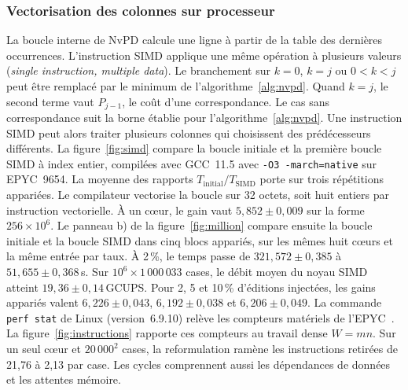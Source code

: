 \subsubsection{Vectorisation des colonnes sur processeur}
La boucle interne de NvPD calcule une ligne à partir de la table des dernières occurrences. L'instruction SIMD applique une même opération à plusieurs valeurs (\emph{single instruction, multiple data}). Le branchement sur \(k=0\), \(k=j\) ou \(0<k<j\) peut être remplacé par le minimum de l'algorithme~\ref{alg:nvpd}. Quand \(k=j\), le second terme vaut \(P_{j-1}\), le coût d'une correspondance. Le cas sans correspondance suit la borne établie pour l'algorithme~\ref{alg:nvpd}. Une instruction SIMD peut alors traiter plusieurs colonnes qui choisissent des prédécesseurs différents.
\FloatBarrier
La figure~\ref{fig:simd} compare la boucle initiale et la première boucle SIMD à index entier, compilées avec GCC~11.5 avec \texttt{-O3 -march=native} sur EPYC~9654. La moyenne des rapports \(T_\mathrm{initial}/T_\mathrm{SIMD}\) porte sur trois répétitions appariées. Le compilateur vectorise la boucle sur 32 octets, soit huit entiers par instruction vectorielle. À un cœur, le gain vaut \(5{,}852\pm0{,}009\) sur la forme \(256\times10^6\). Le panneau b) de la figure~\ref{fig:million} compare ensuite la boucle initiale et la boucle SIMD dans cinq blocs appariés, sur les mêmes huit cœurs et la même entrée par taux. À 2\,\%, le temps passe de \(321{,}572\pm0{,}385\) à \(51{,}655\pm0{,}368\)\,s. Sur \(10^6\times1\,000\,033\) cases, le débit moyen du noyau SIMD atteint \(19{,}36\pm0{,}14\)\,GCUPS. Pour 2, 5 et 10\,\% d'éditions injectées, les gains appariés valent \(6{,}226\pm0{,}043\), \(6{,}192\pm0{,}038\) et \(6{,}206\pm0{,}049\).
La commande \texttt{perf stat} de Linux (version~6.9.10) relève les compteurs matériels de l'EPYC~\cite{perfstat}. La figure~\ref{fig:instructions} rapporte ces compteurs au travail dense \(W=mn\). Sur un seul cœur et \(20\,000^2\) cases, la reformulation ramène les instructions retirées de 21,76 à 2,13 par case. Les cycles comprennent aussi les dépendances de données et les attentes mémoire.


